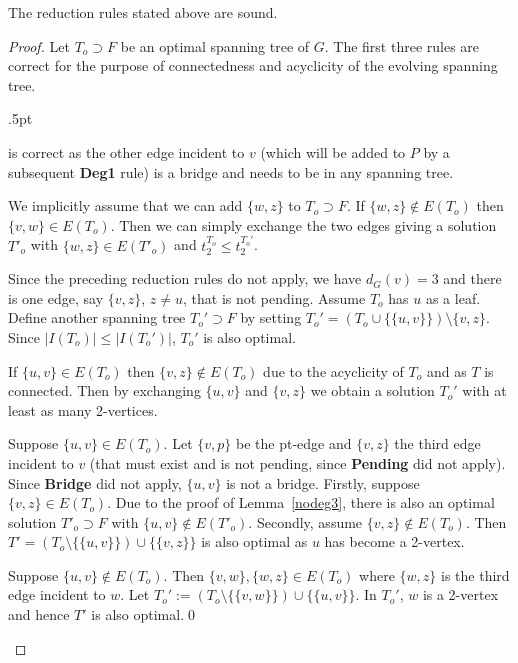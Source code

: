 \documentclass{llncs}
\begin{document}
\begin{lemma}
The reduction rules stated above are sound.
\end{lemma}
\begin{proof}
Let $T_o \supset F$ be an optimal spanning tree of $G$. The first three rules are correct for the purpose of connectedness and acyclicity of the evolving spanning tree. 
\begin{description}\itemsep.5pt
\item[\bf Pending] is correct as the other edge incident to $v$ (which will be added to $P$ by a subsequent {\bf Deg1} rule) is a bridge and needs to be in any spanning tree. 
\item [\bf ConsDeg2] We implicitly assume that we can add $\{w,z\}$ to $T_o \supset F$. If $\{w,z\} \notin E(T_o)$ then $\{v,w\} \in E(T_o)$. Then we can simply exchange the two edges giving a solution $T'_o$ with $\{w,z\} \in E(T'_o)$ and $t_2^{T_o}\le t_2^{T_o'}$.  \item[\bf Deg2] Since the preceding reduction rules do not apply, we have $d_G(v)=3$ and there is one edge, say
$\{v,z\}$, $z\neq u$, that is not pending. Assume $T_o$ 
has $u$ as a leaf. Define 
another spanning tree $T_o'\supset F$ by setting $T_o'=(T_o\cup\{\{u,v\}\})\setminus\{v,z\}$.
Since 
$|I(T_o)|\leq |I(T_o')|$, $T_o'$ is also optimal.   
\item[\bf Attach] If $\{u,v\} \in E(T_o)$ then $\{v,z\} \not \in E(T_o)$ due to the acyclicity of $T_o$ and as $T$ is connected. Then by exchanging $\{u,v\}$ and $\{v,z\}$ we obtain a solution $T_o'$ with at least as many 2-vertices.
\item[\bf Attach2] Suppose $\{u,v\} \in E(T_o)$. Let $\{v,p\}$ be the pt-edge and $\{v,z\}$ the third edge incident to $v$ (that must exist and is not pending, since {\bf Pending} did not apply). Since {\bf Bridge} did not apply, $\{u,v\}$ is not a bridge. 
Firstly, suppose $\{v,z\} \in E(T_o)$. Due to the proof of Lemma~\ref{nodeg3}, there is also an optimal solution $T'_o\supset F$ with $\{u,v\} \notin E(T'_o)$.
Secondly, assume $\{v,z\} \notin E(T_o)$. Then $T'=(T_o \setminus \{\{u,v\}\}) \cup \{\{v,z\}\}$ is also optimal as $u$ has become a 2-vertex.
\item[Special] Suppose $\{u,v\} \not \in E(T_o)$. Then $\{v,w\},\{w,z\} \in E(T_o)$ where $\{w,z\}$ is the third edge incident to $w$. Let $T_o':=(T_o \setminus \{\{v,w\}\}) \cup \{\{u,v\}\}$. In $T_o'$, $w$ is a 2-vertex and hence $T'$ is also optimal.\qed
\end{description}
\end{proof}
\end{document}
